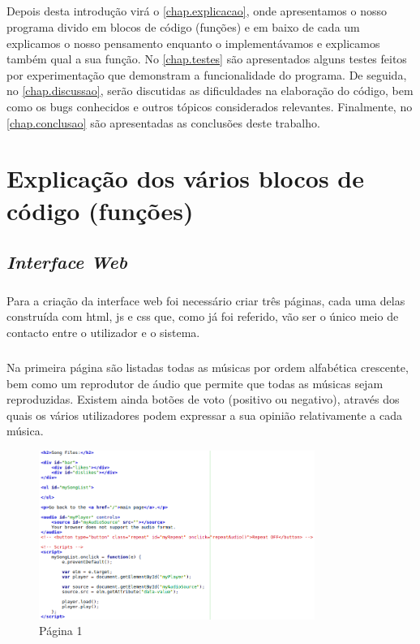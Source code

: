 \documentclass[a4paper]{report}
\begin{document}
\paragraph{}Depois desta introdução virá o \autoref{chap.explicacao}, onde apresentamos o nosso programa divido em blocos de código (funções) e em baixo de cada um explicamos o nosso pensamento enquanto o implementávamos e explicamos também qual a sua função.
No \autoref{chap.testes} são apresentados alguns testes feitos por experimentação que demonstram a funcionalidade do programa.
De seguida, no \autoref{chap.discussao}, serão discutidas as dificuldades na elaboração do código, bem como os bugs conhecidos e outros tópicos considerados relevantes.
Finalmente, no \autoref{chap.conclusao} são apresentadas as conclusões deste trabalho.

\chapter{Explicação dos vários blocos de código (funções)}
\label{chap.explicacao}

\section{\textit{Interface Web}}

\paragraph{}Para a criação da interface web foi necessário criar três páginas, cada uma delas construída com \ac{html}, \ac{js} e \ac{css} que, como já foi referido, vão ser o único meio de contacto entre o utilizador e o sistema.
\paragraph{}Na primeira página são listadas todas as músicas por ordem alfabética crescente, bem como um reprodutor de áudio que permite que todas as músicas sejam reproduzidas. Existem ainda botões de voto (positivo ou negativo), através dos quais os vários utilizadores podem expressar a sua opinião relativamente a cada música.

\begin{figure}[H]
\center
\includegraphics[width=9cm]{imagens/page1}
\caption{Página 1}
\end{figure}
\end{document}
